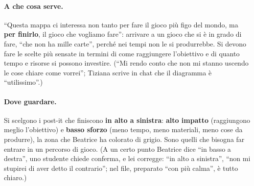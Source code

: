 \paragraph{A che cosa serve.} ``Questa mappa ci interessa non tanto per fare il gioco
più figo del mondo, ma \textbf{per finirlo}, il gioco che vogliamo fare'': arrivare a
un gioco che si è in grado di fare, ``che non ha mille carte'', perché nei tempi non
le si produrrebbe. Si devono fare le scelte più sensate in termini di come raggiungere
l'obiettivo e di quanto tempo e risorse si possono investire. (``Mi rendo conto che
non mi stanno uscendo le cose chiare come vorrei''; Tiziana scrive in chat che il
diagramma è ``utilissimo''.)

\paragraph{Dove guardare.} Si scelgono i post-it che finiscono \textbf{in alto a
sinistra}: \textbf{alto impatto} (raggiungono meglio l'obiettivo) e \textbf{basso
sforzo} (meno tempo, meno materiali, meno cose da produrre), la zona che Beatrice ha
colorato di grigio. Sono quelli che bisogna far entrare in un percorso di gioco. (A
un certo punto Beatrice dice ``in basso a destra'', uno studente chiede conferma, e
lei corregge: ``in alto a sinistra'', ``non mi stupirei di aver detto il contrario'';
nel file, preparato ``con più calma'', è tutto chiaro.)


